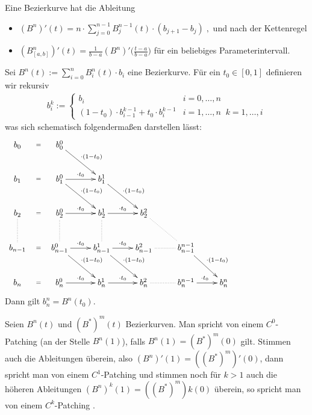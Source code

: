 \begin{Satz}
Eine Bezierkurve hat die Ableitung
\begin{itemize}
\item $(B^n)'(t) = n \cdot \sum_{j = 0}^{n-1} B_{j}^{n-1}(t) \cdot (b_{j+1} - b_j) \; ,$ und nach der Kettenregel
\item $(B^n_{[a,b]})'(t) = \frac{1}{b-a} (B^n)' \bigl(\frac{t -a}{b-a} \bigr)$  für ein beliebiges Parameterintervall.
\end{itemize}
\end{Satz}

\begin{Satz}
Sei $B^n(t) := \sum_{i = 0}^{n} B_i^n(t) \cdot  b_i$ eine Bezierkurve. Für ein 
$t_0 \in [0,1]$ definieren wir rekursiv  
\begin{align*}
b_i^k := \begin{cases}
b_i   & i= 0, \hdots,  n \\
(1-t_0) \cdot b_{i-1}^{k-1} + t_0 \cdot b_{i}^{k-1} &  i = 1, \hdots , n \; \;   k = 1, \hdots , i 
\end{cases} 
\end{align*}
was sich schematisch folgendermaßen darstellen lässt: 
\begin{align*}
\xymatrix{
b_0   \ar@{}[r]|-{=}  &  b_0^0 \ar[dr]^{\cdot(1-t_0)}  &  & & & & & &  \\
b_1   \ar@{}[r]|-{=}  &  b_1^0  \ar[r]^{\cdot t_0} \ar[dr]^{\cdot(1-t_0)} &   b_1^1  \ar[dr]^{\cdot(1-t_0)} & & & & & & \\
b_2   \ar@{}[r]|-{=}  \ar@{..}[d] &  b_2^0  \ar[r]^{\cdot t_0}  \ar@{..}[d] &   b_2^1 \ar[r]^{\cdot t_0}  \ar@{..}[d] &  b_2^2   \ar@{..}[dr]& & & & & \\
b_{n-1}   \ar@{}[r]|-{=}  &  b_{n-1}^0   \ar[r]^{\cdot t_0}  \ar[dr]^{\cdot(1-t_0)} &    b_{n-1}^1   \ar[r]^{\cdot t_0}  \ar[dr]^{\cdot(1-t_0)} &  b_{n-1}^2  \ar@{..}[r] &  
b_{n-1}^{n-1}  \ar[dr]^{\cdot(1-t_0)} & & & & \\
b_{n}   \ar@{}[r]|-{=}  &  b_{n}^0  \ar[r]^{\cdot t_0}  &    b_{n}^1   \ar[r]^{\cdot t_0}  &  b_{n}^2  \ar@{..}[r] & b_{n}^{n-1}   \ar[r]^{\cdot t_0}& b_{n}^{n}& & & 
}
\end{align*}
Dann gilt $b_n^n = B^n(t_0)$.
\end{Satz}

 



\begin{Definition}[Patching]
Seien $B^n(t)$ und $(B^*)^m(t)$  Bezierkurven. Man spricht von einem $C^0$-Patching (an der Stelle $B^n(1)$), falls
 $B^n(1) = (B^*)^m(0) $ gilt. Stimmen auch die Ableitungen überein, also  $(B^n)'(1) = ((B^*)^m)'(0) $, dann spricht man von einem $C^1$-Patching und stimmen noch für $k> 1$ auch
die höheren Ableitungen $(B^n)^{k}(1) = ((B^*)^m){k}(0) $ überein, so spricht man von einem $C^k$-Patching . 
 \end{Definition}


